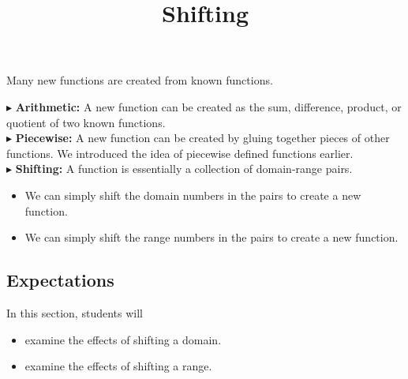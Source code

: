 \documentclass{ximera}
\title{Shifting}
\begin{document}
\begin{abstract}
\end{abstract}
\maketitle





Many new functions are created from known functions.


$\blacktriangleright$ \textbf{Arithmetic:} A new function can be created as the sum, difference, product, or quotient of two known functions. \\


$\blacktriangleright$ \textbf{Piecewise:} A new function can be created by gluing together pieces of other functions.  We introduced the idea of piecewise defined functions earlier. \\


$\blacktriangleright$ \textbf{Shifting:}  A function is essentially a collection of domain-range pairs.  


\begin{itemize}
\item We can simply shift the domain numbers in the pairs to create a new function.
\item We can simply shift the range numbers in the pairs to create a new function.
\end{itemize}




\subsection{Expectations}


\begin{sectionOutcomes}
In this section, students will 

\begin{itemize}
\item examine the effects of shifting a domain.
\item examine the effects of shifting a range.
\end{itemize}
\end{sectionOutcomes}
\end{document}
